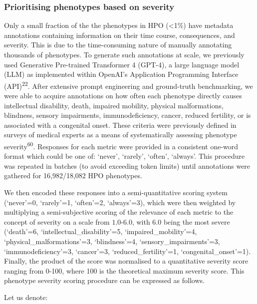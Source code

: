 \documentclass[
]{article}
\begin{document}
\subsubsection{Prioritising phenotypes based on
severity}\label{prioritising-phenotypes-based-on-severity-1}

Only a small fraction of the the phenotypes in HPO (\textless1\%) have
metadata annotations containing information on their time course,
consequences, and severity. This is due to the time-consuming nature of
manually annotating thousands of phenotypes. To generate such
annotations at scale, we previously used Generative Pre-trained
Transformer 4 (GPT-4), a large language model (LLM) as implemented
within OpenAI's Application Programming Interface
(API)\textsuperscript{22}. After extensive prompt engineering and
ground-truth benchmarking, we were able to acquire annotations on how
often each phenotype directly causes intellectual disability, death,
impaired mobility, physical malformations, blindness, sensory
impairments, immunodeficiency, cancer, reduced fertility, or is
associated with a congenital onset. These criteria were previously
defined in surveys of medical experts as a means of systematically
assessing phenotype severity\textsuperscript{60}. Responses for each
metric were provided in a consistent one-word format which could be one
of: `never', `rarely', `often', `always'. This procedure was repeated in
batches (to avoid exceeding token limits) until annotations were
gathered for 16,982/18,082 HPO phenotypes.

We then encoded these responses into a semi-quantitative scoring system
(`never'=0, `rarely'=1, `often'=2, `always'=3), which were then weighted
by multiplying a semi-subjective scoring of the relevance of each metric
to the concept of severity on a scale from \(1.0\)-\(6.0\), with \(6.0\)
being the most severe (`death'=6, `intellectual\_disability'=5,
`impaired\_mobility'=4, `physical\_malformations'=3, `blindness'=4,
`sensory\_impairments'=3, `immunodeficiency'=3, `cancer'=3,
`reduced\_fertility'=1, `congenital\_onset'=1). Finally, the product of
the score was normalised to a quantitative severity score ranging from
0-100, where 100 is the theoretical maximum severity score. This
phenotype severity scoring procedure can be expressed as follows.

Let us denote:
\end{document}
